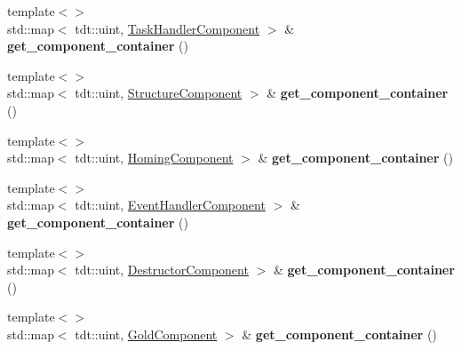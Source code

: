 \begin{DoxyCompactItemize}
\item 
{\footnotesize template$<$$>$ }\\std\+::map$<$ tdt\+::uint, \hyperlink{struct_task_handler_component}{Task\+Handler\+Component} $>$ \& {\bfseries get\+\_\+component\+\_\+container} ()\hypertarget{class_entity_system_a0d719edae805faa82867fd22b25e29c8}{}\label{class_entity_system_a0d719edae805faa82867fd22b25e29c8}

\item 
{\footnotesize template$<$$>$ }\\std\+::map$<$ tdt\+::uint, \hyperlink{struct_structure_component}{Structure\+Component} $>$ \& {\bfseries get\+\_\+component\+\_\+container} ()\hypertarget{class_entity_system_a92e8154678c984c767a0e4a6ad551d9f}{}\label{class_entity_system_a92e8154678c984c767a0e4a6ad551d9f}

\item 
{\footnotesize template$<$$>$ }\\std\+::map$<$ tdt\+::uint, \hyperlink{struct_homing_component}{Homing\+Component} $>$ \& {\bfseries get\+\_\+component\+\_\+container} ()\hypertarget{class_entity_system_adfa0ce8b0c3fc1b6f1458a0d4627e31e}{}\label{class_entity_system_adfa0ce8b0c3fc1b6f1458a0d4627e31e}

\item 
{\footnotesize template$<$$>$ }\\std\+::map$<$ tdt\+::uint, \hyperlink{struct_event_handler_component}{Event\+Handler\+Component} $>$ \& {\bfseries get\+\_\+component\+\_\+container} ()\hypertarget{class_entity_system_a7d53589e27f0dded16549db53cc0e217}{}\label{class_entity_system_a7d53589e27f0dded16549db53cc0e217}

\item 
{\footnotesize template$<$$>$ }\\std\+::map$<$ tdt\+::uint, \hyperlink{struct_destructor_component}{Destructor\+Component} $>$ \& {\bfseries get\+\_\+component\+\_\+container} ()\hypertarget{class_entity_system_a973f9887b478d19017f4acbe16741054}{}\label{class_entity_system_a973f9887b478d19017f4acbe16741054}

\item 
{\footnotesize template$<$$>$ }\\std\+::map$<$ tdt\+::uint, \hyperlink{struct_gold_component}{Gold\+Component} $>$ \& {\bfseries get\+\_\+component\+\_\+container} ()\hypertarget{class_entity_system_af9586207497be5f663aa009c940d780c}{}\label{class_entity_system_af9586207497be5f663aa009c940d780c}


\end{DoxyCompactItemize}
